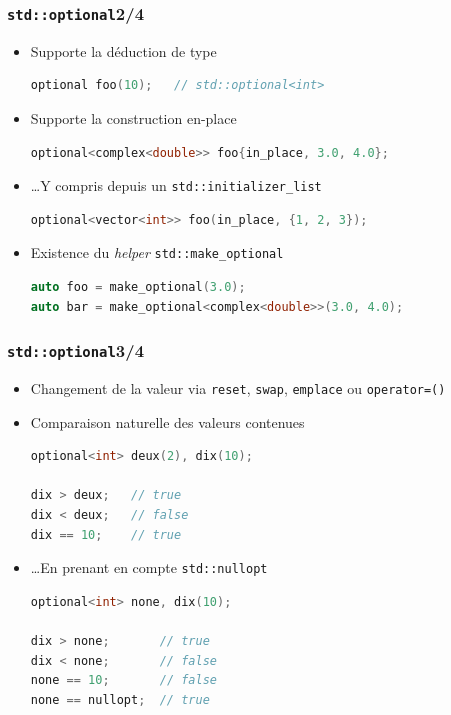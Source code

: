 \documentclass[C++.tex]{subfiles}
\begin{document}
\begin{frame}[fragile]
	\frametitle{\lstinline|std::optional|\titlehfill{}2/4}
	\begin{itemize}
		\item Supporte la déduction de type

	\begin{lstlisting}[language=C++]
optional foo(10);	// std::optional<int>\end{lstlisting}

		\item Supporte la construction \og en-place\fg{}
		
	\begin{lstlisting}[language=C++]
optional<complex<double>> foo{in_place, 3.0, 4.0};\end{lstlisting}
		
		\item \ldots Y compris depuis un \lstinline|std::initializer_list|
	\begin{lstlisting}[language=C++]
optional<vector<int>> foo(in_place, {1, 2, 3});\end{lstlisting}

		\item Existence du \textit{helper} \lstinline|std::make_optional|
		
	\begin{lstlisting}[language=C++]
auto foo = make_optional(3.0);
auto bar = make_optional<complex<double>>(3.0, 4.0);\end{lstlisting}
	\end{itemize}
\end{frame}

\begin{frame}[fragile]
	\frametitle{\lstinline|std::optional|\titlehfill{}3/4}
	\begin{itemize}
		\item Changement de la valeur via \lstinline|reset|, \lstinline|swap|, \lstinline|emplace| ou \lstinline|operator=()|
		\item Comparaison naturelle des valeurs contenues 

		\begin{lstlisting}[language=C++]
optional<int> deux(2), dix(10);

dix > deux;   // true	
dix < deux;   // false
dix == 10;    // true\end{lstlisting}

		\item \ldots En prenant en compte \lstinline|std::nullopt|

		\begin{lstlisting}[language=C++]
optional<int> none, dix(10);

dix > none;       // true	
dix < none;       // false
none == 10;       // false
none == nullopt;  // true\end{lstlisting}


	\end{itemize}
\end{frame}
\end{document}
